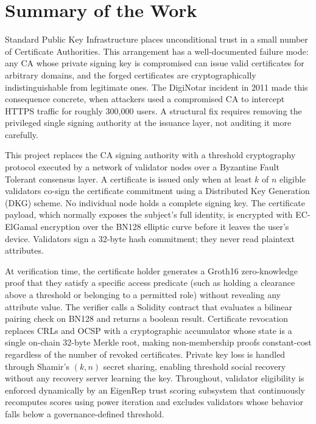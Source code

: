 \documentclass[12pt,a4paper]{article}
\begin{document}
\newpage

\section{Summary of the Work}

Standard Public Key Infrastructure places unconditional trust in a small number of Certificate Authorities. This arrangement has a well-documented failure mode: any CA whose private signing key is compromised can issue valid certificates for arbitrary domains, and the forged certificates are cryptographically indistinguishable from legitimate ones. The DigiNotar incident in 2011 made this consequence concrete, when attackers used a compromised CA to intercept HTTPS traffic for roughly 300,000 users. A structural fix requires removing the privileged single signing authority at the issuance layer, not auditing it more carefully.

This project replaces the CA signing authority with a threshold cryptography protocol executed by a network of validator nodes over a Byzantine Fault Tolerant consensus layer. A certificate is issued only when at least $k$ of $n$ eligible validators co-sign the certificate commitment using a Distributed Key Generation (DKG) scheme. No individual node holds a complete signing key. The certificate payload, which normally exposes the subject's full identity, is encrypted with EC-ElGamal encryption over the BN128 elliptic curve before it leaves the user's device. Validators sign a 32-byte hash commitment; they never read plaintext attributes.

At verification time, the certificate holder generates a Groth16 zero-knowledge proof that they satisfy a specific access predicate (such as holding a clearance above a threshold or belonging to a permitted role) without revealing any attribute value. The verifier calls a Solidity contract that evaluates a bilinear pairing check on BN128 and returns a boolean result. Certificate revocation replaces CRLs and OCSP with a cryptographic accumulator whose state is a single on-chain 32-byte Merkle root, making non-membership proofs constant-cost regardless of the number of revoked certificates. Private key loss is handled through Shamir's $(k,n)$ secret sharing, enabling threshold social recovery without any recovery server learning the key. Throughout, validator eligibility is enforced dynamically by an EigenRep trust scoring subsystem that continuously recomputes scores using power iteration and excludes validators whose behavior falls below a governance-defined threshold.
\end{document}
